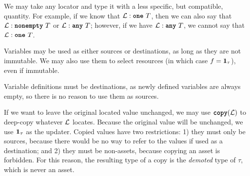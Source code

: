 \documentclass[nonacm, dvipsnames, sigconf]{acmart}
\begin{document}
We may take any locator and type it with a less specific, but compatible, quantity.
For example, if we know that $\Loc : \exactlyone~T$, then we can also say that $\Loc : \nonempty~T$ or $\Loc : \any~T$; however, if we have $\Loc : \any~T$, we cannot say that $\Loc : \exactlyone~T$.
\begin{mathpar}
\end{mathpar}

Variables may be used as either sources or destinations, as long as they are not immutable.
We may also use them to select resources (in which case $f = \id{\tau}$), even if immutable.
\begin{mathpar}
\end{mathpar}

Variable definitions must be destinations, as newly defined variables are always empty, so there is no reason to use them as sources.
\begin{mathpar}
\end{mathpar}

If we want to leave the original located value unchanged, we may use $\copyC(\Loc)$ to deep-copy whatever $\Loc$ locates.
Because the original value will be unchanged, we use $\id{\tau}$ as the updater.
Copied values have two restrictions: 1) they must only be sources, because there would be no way to refer to the values if used as a destination; and 2) they must be non-assets, because copying an asset is forbidden.
For this reason, the resulting type of a copy is the \emph{demoted} type of $\tau$, which is never an asset.
\begin{mathpar}

\end{mathpar}
\end{document}
